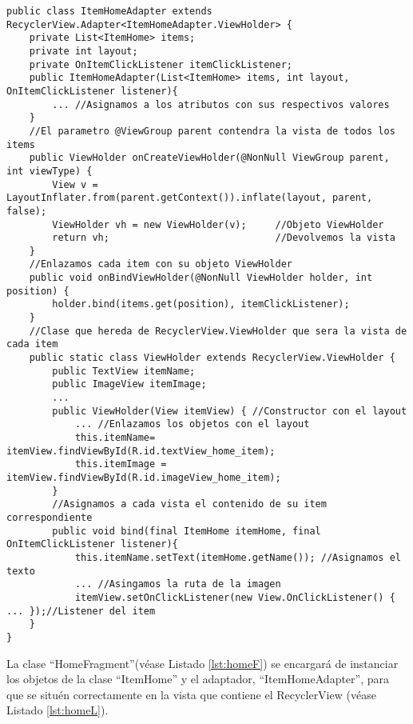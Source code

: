     


\bigskip


\begin{lstlisting}[caption={Fichero \texttt{ItemHomeAdapter.java}, clase que contruye las vistas de los items.},  label={lst:adapterItem}]
public class ItemHomeAdapter extends RecyclerView.Adapter<ItemHomeAdapter.ViewHolder> {
    private List<ItemHome> items;
    private int layout;
    private OnItemClickListener itemClickListener;
    public ItemHomeAdapter(List<ItemHome> items, int layout, OnItemClickListener listener){
        ... //Asignamos a los atributos con sus respectivos valores
    }
    //El parametro @ViewGroup parent contendra la vista de todos los items
    public ViewHolder onCreateViewHolder(@NonNull ViewGroup parent, int viewType) {
        View v = LayoutInflater.from(parent.getContext()).inflate(layout, parent, false);
        ViewHolder vh = new ViewHolder(v);     //Objeto ViewHolder  
        return vh;                             //Devolvemos la vista    
    }
    //Enlazamos cada item con su objeto ViewHolder
    public void onBindViewHolder(@NonNull ViewHolder holder, int position) {
        holder.bind(items.get(position), itemClickListener);
    }
    //Clase que hereda de RecyclerView.ViewHolder que sera la vista de cada item
    public static class ViewHolder extends RecyclerView.ViewHolder { 
        public TextView itemName;     
        public ImageView itemImage;   
        ...
        public ViewHolder(View itemView) { //Constructor con el layout
            ... //Enlazamos los objetos con el layout
            this.itemName= itemView.findViewById(R.id.textView_home_item);     
            this.itemImage = itemView.findViewById(R.id.imageView_home_item);
        }
        //Asignamos a cada vista el contenido de su item correspondiente 
        public void bind(final ItemHome itemHome, final OnItemClickListener listener){
            this.itemName.setText(itemHome.getName()); //Asignamos el texto
            ... //Asingamos la ruta de la imagen
            itemView.setOnClickListener(new View.OnClickListener() { ... });//Listener del item
    }
}
\end{lstlisting}

La clase ``HomeFragment''(véase Listado \ref{lst:homeF}) se encargará de instanciar los objetos de la clase ``ItemHome'' y el adaptador, ``ItemHomeAdapter'', para que se situén correctamente en la vista que contiene el RecyclerView (véase Listado \ref{lst:homeL}). 

